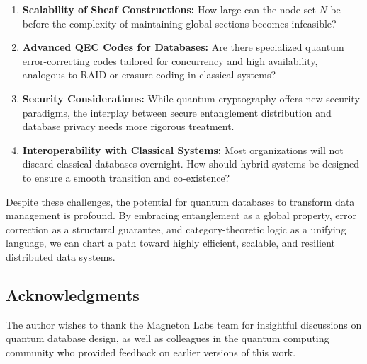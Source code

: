 \documentclass[12pt]{article}
\theoremstyle{definition}
\theoremstyle{remark}
\begin{document}
\begin{enumerate}[label=(\roman*)]
    \item \textbf{Scalability of Sheaf Constructions:} How large can the node set $N$ be before the complexity of maintaining global sections becomes infeasible?
    \item \textbf{Advanced QEC Codes for Databases:} Are there specialized quantum error-correcting codes tailored for concurrency and high availability, analogous to RAID or erasure coding in classical systems?
    \item \textbf{Security Considerations:} While quantum cryptography offers new security paradigms, the interplay between secure entanglement distribution and database privacy needs more rigorous treatment.
    \item \textbf{Interoperability with Classical Systems:} Most organizations will not discard classical databases overnight. How should hybrid systems be designed to ensure a smooth transition and co-existence?
\end{enumerate}

Despite these challenges, the potential for quantum databases to transform data management is profound. By embracing entanglement as a global property, error correction as a structural guarantee, and category-theoretic logic as a unifying language, we can chart a path toward highly efficient, scalable, and resilient distributed data systems.

\subsection*{Acknowledgments}
The author wishes to thank the Magneton Labs team for insightful discussions on quantum database design, as well as colleagues in the quantum computing community who provided feedback on earlier versions of this work.
\end{document}

